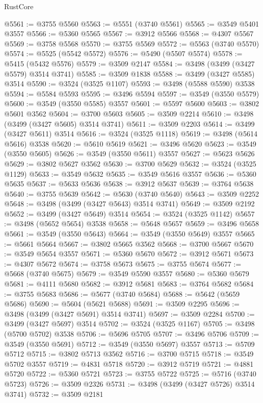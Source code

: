 \begin{lexlean}{RustCore}
\begin{coremodule}
@5561 := @3755 @5560
@5563 := @5551 (@3740 @5561)
@5565 := @3549 @5401 @3557
@5566 := @5360 @5565
@5567 := @3912 @5566
@5568 := @4307 @5567
@5569 := @3758 @5568
@5570 := @3755 @5569
@5572 := @5563 (@3740 @5570)
@5574 := @5525 (@5542 @5572)
@5576 := @5490 (@5507 @5574)
@5578 := @5415 (@5432 @5576)
@5579 := @3509 @2147
@5584 := @3498 (@3499 (@3427 @5579) @3514 @3741)
@5585 := @3509 @1838
@5588 := @3499 (@3427 @5585) @3514
@5590 := @3524 (@3525 @1107)
@5593 := @3498 (@5588 @5590) @3538
@5594 := @5584 @5593
@5595 := @3496 @5594
@5597 := @3549 (@3550 @5579)
@5600 := @3549 (@3550 @5585) @3557
@5601 := @5597 @5600
@5603 := @3802 @5601 @3562
@5604 := @3700 @5603
@5605 := @3509 @2214
@5610 := @3498 (@3499 (@3427 @5605) @3514 @3741)
@5611 := @3509 @2203
@5614 := @3499 (@3427 @5611) @3514
@5616 := @3524 (@3525 @1118)
@5619 := @3498 (@5614 @5616) @3538
@5620 := @5610 @5619
@5621 := @3496 @5620
@5623 := @3549 (@3550 @5605)
@5626 := @3549 (@3550 @5611) @3557
@5627 := @5623 @5626
@5629 := @3802 @5627 @3562
@5630 := @3700 @5629
@5632 := @3524 (@3525 @1129)
@5633 := @3549 @5632
@5635 := @3549 @5616 @3557
@5636 := @5360 @5635
@5637 := @5633 @5636
@5638 := @3912 @5637
@5639 := @3764 @5638
@5640 := @3755 @5639
@5642 := @5630 (@3740 @5640)
@5643 := @3509 @2252
@5648 := @3498 (@3499 (@3427 @5643) @3514 @3741)
@5649 := @3509 @2192
@5652 := @3499 (@3427 @5649) @3514
@5654 := @3524 (@3525 @1142)
@5657 := @3498 (@5652 @5654) @3538
@5658 := @5648 @5657
@5659 := @3496 @5658
@5661 := @3549 (@3550 @5643)
@5664 := @3549 (@3550 @5649) @3557
@5665 := @5661 @5664
@5667 := @3802 @5665 @3562
@5668 := @3700 @5667
@5670 := @3549 @5654 @3557
@5671 := @5360 @5670
@5672 := @3912 @5671
@5673 := @4307 @5672
@5674 := @3758 @5673
@5675 := @3755 @5674
@5677 := @5668 (@3740 @5675)
@5679 := @3549 @5590 @3557
@5680 := @5360 @5679
@5681 := @4111 @5680
@5682 := @3912 @5681
@5683 := @3764 @5682
@5684 := @3755 @5683
@5686 := @5677 (@3740 @5684)
@5688 := @5642 (@5659 @5686)
@5690 := @5604 (@5621 @5688)
@5691 := @3509 @2295
@5696 := @3498 (@3499 (@3427 @5691) @3514 @3741)
@5697 := @3509 @2284
@5700 := @3499 (@3427 @5697) @3514
@5702 := @3524 (@3525 @1167)
@5705 := @3498 (@5700 @5702) @3538
@5706 := @5696 @5705
@5707 := @3496 @5706
@5709 := @3549 (@3550 @5691)
@5712 := @3549 (@3550 @5697) @3557
@5713 := @5709 @5712
@5715 := @3802 @5713 @3562
@5716 := @3700 @5715
@5718 := @3549 @5702 @3557
@5719 := @4831 @5718
@5720 := @3912 @5719
@5721 := @4881 @5720
@5722 := @5360 @5721
@5723 := @3755 @5722
@5725 := @5716 (@3740 @5723)
@5726 := @3509 @2326
@5731 := @3498 (@3499 (@3427 @5726) @3514 @3741)
@5732 := @3509 @2181

\end{coremodule}
\end{lexlean}
